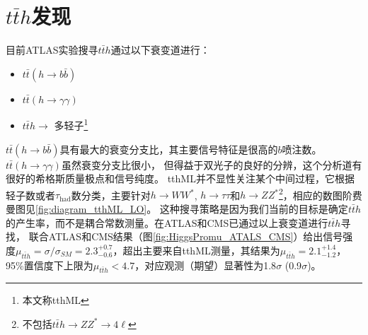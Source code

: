 \section{$t\bar{t}h$发现}
目前ATLAS实验搜寻$t\bar{t}h$通过以下衰变道进行：
\begin{itemize}
 \item $t\bar{t}(h\rightarrow b\bar{b})$
 \item $t\bar{t}(h\rightarrow \gamma\gamma)$
 \item $t\bar{t}h\rightarrow$ 多轻子\footnote{本文称tthML}
\end{itemize}
$t\bar{t}(h\rightarrow b\bar{b})$具有最大的衰变分支比，其主要信号特征是很高的$b$喷注数。$t\bar{t}(h\rightarrow \gamma\gamma)$虽然衰变分支比很小，
但得益于双光子的良好的分辨，这个分析道有很好的希格斯质量极点和信号纯度。
tthML并不显性关注某个中间过程，它根据轻子数或者$\tau_{\text{had}}$数分类，主要针对$h\rightarrow WW^*$, $h\rightarrow \tau\tau$和$h\rightarrow ZZ^*$\footnote{不包括$t\bar{t}h\rightarrow ZZ^*\rightarrow 4\ell$}，相应的数图阶费曼图见\ref{fig:diagram_tthML_LO}。
这种搜寻策略是因为我们当前的目标是确定$t\bar{t}h$的产生率，而不是耦合常数测量。在\RunOne ATLAS和CMS已通过以上衰变道进行$t\bar{t}h$寻找\cite{Aad:2015iha,Aad:2015gra,Aad:2014lma,Khachatryan:2014qaa,Khachatryan:2015ila,Khachatryan:2016vau}，
联合ATLAS和CMS结果（图\ref{fig:HiggsPromu_ATALS_CMS}）给出信号强度$\mu_{t\bar{t}h}=\sigma/\sigma_{SM}=2.3^{+0.7}_{-0.6}$，超出主要来自tthML测量，其结果为$\mu_{t\bar{t}h}=2.1^{+1.4}_{-1.2}$，95\%置信度下上限为$\mu_{t\bar{t}h}<4.7$，对应观测（期望）显著性为1.8$\sigma$ (0.9$\sigma$)。

